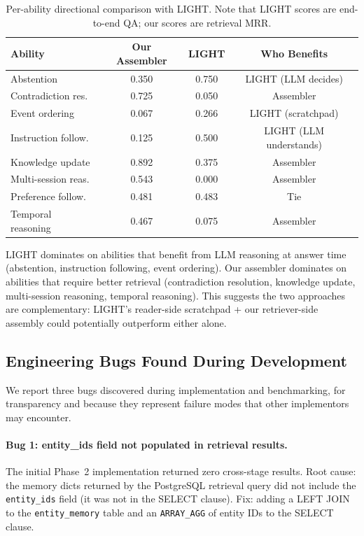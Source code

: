 \documentclass[11pt]{article}
\begin{document}
\begin{table}[h]
\centering
\caption{Per-ability directional comparison with LIGHT.  Note that
  LIGHT scores are end-to-end QA; our scores are retrieval MRR.}
\label{tab:light-comparison}
\small
\begin{tabular}{lccc}
\toprule
Ability & Our Assembler & LIGHT & Who Benefits \\
\midrule
Abstention & 0.350 & 0.750 & LIGHT (LLM decides) \\
Contradiction res. & 0.725 & 0.050 & Assembler \\
Event ordering & 0.067 & 0.266 & LIGHT (scratchpad) \\
Instruction follow. & 0.125 & 0.500 & LIGHT (LLM understands) \\
Knowledge update & 0.892 & 0.375 & Assembler \\
Multi-session reas. & 0.543 & 0.000 & Assembler \\
Preference follow. & 0.481 & 0.483 & Tie \\
Temporal reasoning & 0.467 & 0.075 & Assembler \\
\bottomrule
\end{tabular}
\end{table}

LIGHT dominates on abilities that benefit from LLM reasoning at
answer time (abstention, instruction following, event ordering).
Our assembler dominates on abilities that require better retrieval
(contradiction resolution, knowledge update, multi-session reasoning,
temporal reasoning).  This suggests the two approaches are
complementary: LIGHT's reader-side scratchpad + our retriever-side
assembly could potentially outperform either alone.

\subsection{Engineering Bugs Found During Development}
\label{sec:bugs}

We report three bugs discovered during implementation and
benchmarking, for transparency and because they represent failure
modes that other implementors may encounter.

\paragraph{Bug 1: entity\_ids field not populated in retrieval results.}
The initial Phase~2 implementation returned zero cross-stage results.
Root cause: the memory dicts returned by the PostgreSQL retrieval
query did not include the \texttt{entity\_ids} field (it was not in
the SELECT clause).  Fix: adding a LEFT JOIN to the
\texttt{entity\_memory} table and an \texttt{ARRAY\_AGG} of entity
IDs to the SELECT clause.
\end{document}
